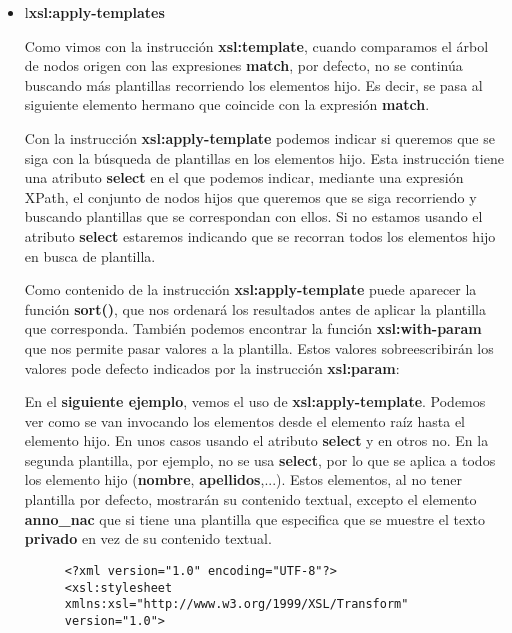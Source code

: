 \begin{itemize}
    \item l\textbf{xsl:apply-templates}

    Como vimos con la instrucción \textbf{xsl:template}, cuando comparamos el árbol de nodos origen con las expresiones \textbf{match}, por defecto, no se continúa buscando más plantillas recorriendo los elementos hijo. Es decir, se pasa al siguiente elemento hermano que coincide con la expresión \textbf{match}.

    Con la instrucción \textbf{xsl:apply-template} podemos indicar si queremos que se siga con la búsqueda de plantillas en los elementos hijo. Esta instrucción tiene una atributo \textbf{select} en el que podemos indicar, mediante una expresión XPath, el conjunto de nodos hijos que queremos que se siga recorriendo y buscando plantillas que se correspondan con ellos. Si no estamos usando el atributo \textbf{select} estaremos indicando que se recorran todos los elementos hijo en busca de plantilla.

    Como contenido de la instrucción \textbf{xsl:apply-template} puede aparecer la función \textbf{sort()}, que nos ordenará los resultados antes de aplicar la plantilla que corresponda. También podemos encontrar la función \textbf{xsl:with-param} que nos permite pasar valores a la plantilla. Estos valores sobreescribirán los valores pode defecto indicados por la instrucción \textbf{xsl:param}:

    En el \textbf{siguiente ejemplo}, vemos el uso de \textbf{xsl:apply-template}. Podemos ver como se van invocando los elementos desde el elemento raíz hasta el elemento hijo. En unos casos usando el atributo \textbf{select} y en otros no. En la segunda plantilla, por ejemplo, no se usa \textbf{select}, por lo que se aplica a todos los elemento hijo (\textbf{nombre}, \textbf{apellidos},...). Estos elementos, al no tener plantilla por defecto, mostrarán su contenido textual, excepto el elemento \textbf{anno\_nac} que si tiene una plantilla que especifica que se muestre el texto \textbf{privado} en vez de su contenido textual.

    \begin{figure}[H]
        \begin{tcolorbox}[sharp corners, colback=yellow!30, colframe=white!20]
            \scriptsize
\begin{verbatim}
<?xml version="1.0" encoding="UTF-8"?>
<xsl:stylesheet xmlns:xsl="http://www.w3.org/1999/XSL/Transform" version="1.0">


\end{verbatim}
\end{tcolorbox}
\end{figure}
\end{itemize}
